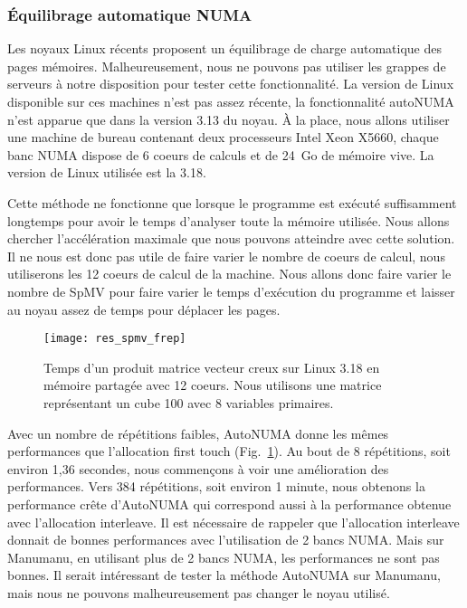 \subsubsection{\'Equilibrage automatique NUMA}
Les noyaux Linux récents proposent un équilibrage de charge automatique des pages mémoires.
%
Malheureusement, nous ne pouvons pas utiliser les grappes de serveurs à notre disposition pour tester cette fonctionnalité.
%
La version de Linux disponible sur ces machines n'est pas assez récente, la fonctionnalité autoNUMA n'est apparue que dans la version 3.13 du noyau.
%
\`A la place, nous allons utiliser une machine de bureau contenant deux processeurs Intel Xeon X5660, chaque banc NUMA dispose de 6 coeurs de calculs et de 24~Go de mémoire vive.
%
La version de Linux utilisée est la 3.18.

Cette méthode ne fonctionne que lorsque le programme est exécuté suffisamment longtemps pour avoir le temps d'analyser toute la mémoire utilisée.
%
Nous allons chercher l'accélération maximale que nous pouvons atteindre avec cette solution.
%
Il ne nous est donc pas utile de faire varier le nombre de coeurs de calcul, nous utiliserons les 12 coeurs de calcul de la machine.
%
Nous allons donc faire varier le nombre de SpMV pour faire varier le temps d'exécution du programme et laisser au noyau assez de temps pour déplacer les pages.

\begin{figure}
  \centering
  \texttt{[image: res\_spmv\_frep]}
  \caption{Temps d'un produit matrice vecteur creux sur Linux 3.18 en mémoire partagée avec 12 coeurs. Nous utilisons une matrice représentant un cube 100 avec 8 variables primaires.}
  \label{fig:res_spmv_frep}
\end{figure}

Avec un nombre de répétitions faibles, AutoNUMA donne les mêmes performances que l'allocation first touch (Fig.~\ref{fig:res_spmv_frep}).
%
Au bout de 8 répétitions, soit environ 1,36 secondes, nous commençons à voir une amélioration des performances.
%
Vers 384 répétitions, soit environ 1 minute, nous obtenons la performance crête d'AutoNUMA qui correspond aussi à la performance obtenue avec l'allocation interleave.
%
Il est nécessaire de rappeler que l'allocation interleave donnait de bonnes performances avec l'utilisation de 2 bancs NUMA.
%
Mais sur Manumanu, en utilisant plus de 2 bancs NUMA, les performances ne sont pas bonnes.
%
Il serait intéressant de tester la méthode AutoNUMA sur Manumanu, mais nous ne pouvons malheureusement pas changer le noyau utilisé.
